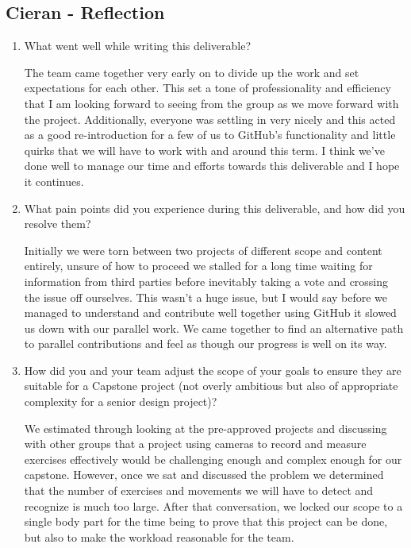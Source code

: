 \documentclass{article}
\begin{document}
\subsection*{Cieran - Reflection}
\begin{enumerate}
    \item What went well while writing this deliverable? 

    The team came together very early on to divide up the work and set expectations for each other. This set a tone of
    professionality and efficiency that I am looking forward to seeing from the group as we move forward with the project.
    Additionally, everyone was settling in very nicely and this acted as a good re-introduction for a few of us to GitHub's
    functionality and little quirks that we will have to work with and around this term. I think we've done well to manage
    our time and efforts towards this deliverable and I hope it continues.

    \item What pain points did you experience during this deliverable, and how
    did you resolve them?

    Initially we were torn between two projects of different scope and content entirely, unsure of how to proceed we
    stalled for a long time waiting for information from third parties before inevitably taking a vote and crossing the
    issue off ourselves. This wasn't a huge issue, but I would say before we managed to understand and contribute well together
    using GitHub it slowed us down with our parallel work. We came together to find an alternative path to parallel contributions
    and feel as though our progress is well on its way.

    \item How did you and your team adjust the scope of your goals to ensure
    they are suitable for a Capstone project (not overly ambitious but also of
    appropriate complexity for a senior design project)?
    
    We estimated through looking at the pre-approved projects and discussing with other groups that a project using cameras to
    record and measure exercises effectively would be challenging enough and complex enough for our capstone. However, once we
    sat and discussed the problem we determined that the number of exercises and movements we will have to detect and recognize
    is much too large. After that conversation, we locked our scope to a single body part for the time being to prove that this
    project can be done, but also to make the workload reasonable for the team.
    
\end{enumerate}  
\end{document}
